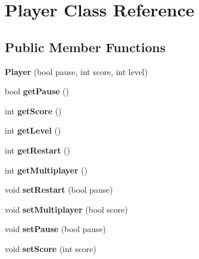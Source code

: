 \hypertarget{classPlayer}{}\section{Player Class Reference}
\label{classPlayer}
\subsection*{Public Member Functions}
\begin{DoxyCompactItemize}
\item 
\mbox{\label{classPlayer_a555e879c595e8b0fd6aa115981ca52de}} 
{\bfseries Player} (bool pause, int score, int level)
\item 
\mbox{\label{classPlayer_a133cd7426d3d94be3d6206248a368a05}} 
bool {\bfseries get\+Pause} ()
\item 
\mbox{\label{classPlayer_a97e5447778ae6c384eedc532dcd8431d}} 
int {\bfseries get\+Score} ()
\item 
\mbox{\label{classPlayer_a10dad3b41b420fcc88e83370d981d35b}} 
int {\bfseries get\+Level} ()
\item 
\mbox{\label{classPlayer_ad6aeca23f071b27bd128bd855a54304e}} 
int {\bfseries get\+Restart} ()
\item 
\mbox{\label{classPlayer_a232a2b887a487cf34397509ee6717846}} 
int {\bfseries get\+Multiplayer} ()
\item 
\mbox{\label{classPlayer_a4c5b1bc0955ff4cac217d2a073bb022f}} 
void {\bfseries set\+Restart} (bool pause)
\item 
\mbox{\label{classPlayer_a1dd7a7ed463a04131e6a61b6f8062b8b}} 
void {\bfseries set\+Multiplayer} (bool score)
\item 
\mbox{\label{classPlayer_a03466eb73d7d9ea95c1b0f9798624961}} 
void {\bfseries set\+Pause} (bool pause)
\item 
\mbox{\label{classPlayer_a23c9b25aeb8dd1ff86d03d993e07a73d}} 
void {\bfseries set\+Score} (int score)
\item 

\end{DoxyCompactItemize}

